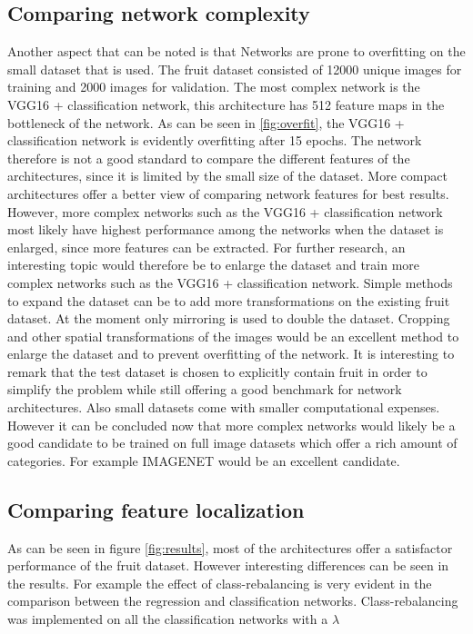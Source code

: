 \subsection{Comparing network complexity}
Another aspect that can be noted is that Networks are prone to overfitting on the small dataset that is used. The fruit dataset consisted of 12000 unique images for training and 2000 images for validation. The most complex network is the VGG16 + classification network, this architecture has 512 feature maps in the bottleneck of the network. As can be seen in \ref{fig:overfit}, the VGG16 + classification network is evidently overfitting after 15 epochs. The network therefore is not a good standard to compare the different features of the architectures, since it is limited by the small size of the dataset. More compact architectures offer a better view of comparing network features for best results. However, more complex networks such as the VGG16 + classification network most likely have highest performance among the networks when the dataset is enlarged, since more features can be extracted. For further research, an interesting topic would therefore be to enlarge the dataset and train more complex networks such as the  VGG16 + classification network. Simple methods to expand the dataset can be to add more transformations on the existing fruit dataset. At the moment only mirroring is used to double the dataset. Cropping and other spatial transformations of the images would be an excellent method to enlarge the dataset and to prevent overfitting of the network. It is interesting to remark that the test dataset is chosen to explicitly contain fruit in order to simplify the problem while still offering a good benchmark for network architectures. Also small datasets come with smaller computational expenses. However it can be concluded now that more complex networks would likely be a good candidate to be trained on full image datasets which offer a rich amount of categories. For example IMAGENET \cite{deng2009imagenet} would be an excellent candidate.
\subsection{Comparing feature localization}
As can be seen in figure \ref{fig:results}, most of the architectures offer a satisfactor performance of the fruit dataset. However interesting differences can be seen in the results. For example the effect of class-rebalancing is very evident in the comparison between the regression and classification networks. Class-rebalancing was implemented on all the classification networks with a $\lambda$
